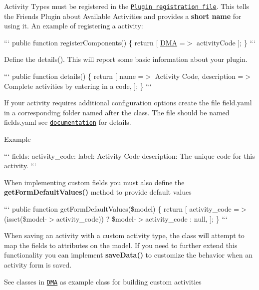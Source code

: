 Activity Types must be registered in the \href{#registration-file}{\tt Plugin registration file}. This tells the Friends Plugin about Available Activities and provides a {\bfseries short name} for using it. An example of registering a activity\+:

``` public function register\+Components() \{ return \mbox{[} \textquotesingle{}\hyperlink{namespaceDMA}{D\+M\+A}\textquotesingle{} =$>$ \textquotesingle{}activity\+Code\textquotesingle{} \mbox{]}; \} ```

Define the details(). This will report some basic information about your plugin.

``` public function details() \{ return \mbox{[} \textquotesingle{}name\textquotesingle{} =$>$ \textquotesingle{}Activity Code\textquotesingle{}, \textquotesingle{}description\textquotesingle{} =$>$ \textquotesingle{}Complete activities by entering in a code\textquotesingle{}, \mbox{]}; \} ```

If your activity requires additional configuration options create the file field.\+yaml in a corresponding folder named after the class. The file should be named fields.\+yaml see \href{https://octobercms.com/docs/backend/forms#field-types}{\tt documentation} for details.

Example

``` fields\+: activity\+\_\+code\+: label\+: Activity Code description\+: The unique code for this activity. ```

When implementing custom fields you must also define the {\bfseries get\+Form\+Default\+Values()} method to provide default values

``` public function get\+Form\+Default\+Values(\$model) \{ return \mbox{[} \textquotesingle{}activity\+\_\+code\textquotesingle{} =$>$ (isset(\$model-\/$>$activity\+\_\+code)) ? \$model-\/$>$activity\+\_\+code \+: null, \mbox{]}; \} ```

When saving an activity with a custom activity type, the class will attempt to map the fields to attributes on the model. If you need to further extend this functionality you can implement {\bfseries save\+Data()} to customize the behavior when an activity form is saved.

See classes in \href{https://github.com/DallasMuseumArt/OctoberFriends/tree/master/activities}{\tt D\+M\+A} as example class for building custom activities 